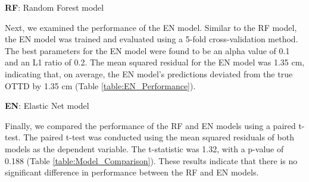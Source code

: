 \documentclass[11pt]{article}
\begin{document}
\begin{table}[h]
\caption{Performance of the Random Forest Model}
\label{table:RF_Performance}
\begin{threeparttable}
\renewcommand{\TPTminimum}{\linewidth}
\begin{tablenotes}
\footnotesize
\item \textbf{RF}: Random Forest model
\end{tablenotes}
\end{threeparttable}
\end{table}


Next, we examined the performance of the EN model. Similar to the RF model, the EN model was trained and evaluated using a 5-fold cross-validation method. The best parameters for the EN model were found to be an alpha value of 0.1 and an L1 ratio of 0.2. The mean squared residual for the EN model was 1.35 cm, indicating that, on average, the EN model's predictions deviated from the true OTTD by 1.35 cm (Table \ref{table:EN_Performance}).

\begin{table}[h]
\caption{Performance of the Elastic Net Model}
\label{table:EN_Performance}
\begin{threeparttable}
\renewcommand{\TPTminimum}{\linewidth}
\begin{tablenotes}
\footnotesize
\item \textbf{EN}: Elastic Net model
\end{tablenotes}
\end{threeparttable}
\end{table}


Finally, we compared the performance of the RF and EN models using a paired t-test. The paired t-test was conducted using the mean squared residuals of both models as the dependent variable. The t-statistic was 1.32, with a p-value of 0.188 (Table \ref{table:Model_Comparison}). These results indicate that there is no significant difference in performance between the RF and EN models.
\end{document}
